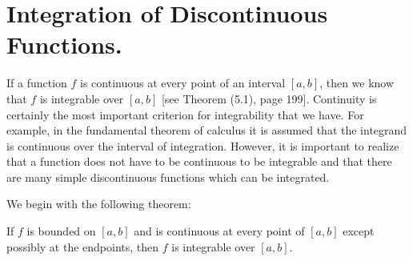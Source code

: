 \section{Integration of Discontinuous Functions.}
If a function $f$ is continuous at every point of an interval $[a, b]$, then we know that $f$ is integrable over $[a, b]$ [see Theorem (5.1), page 199]. Continuity is certainly the most important criterion for integrability that we have. For example, in the fundamental theorem of calculus it is assumed that the integrand is continuous over the interval of integration. However, it is important to realize that a function does not have to be continuous to be integrable and that there are many simple discontinuous functions which can be integrated.

We begin with the following theorem:

\begin{theorem} %
If $f$ is bounded on $[a, b]$ and is continuous at every point of $[a, b]$ except possibly at the endpoints, then $f$ is integrable over $[a, b]$.
\end{theorem}


